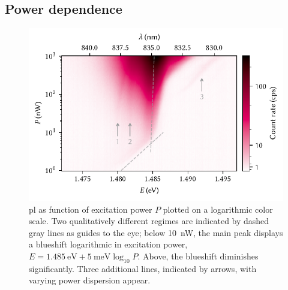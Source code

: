 \subsection{Power dependence}\label{subsec:exp:observations:pl:power}

\begin{figure}
    \centering
    \includegraphics{img/pdf/experiment/doped_M1_05_49-2_power}
    \caption[
        ,
        ,
        .
        \protect\newline
    ]{
        \Gls{pl} as function of excitation power $P$ plotted on a logarithmic color scale.
        Two qualitatively different regimes are indicated by dashed gray lines as guides to the eye; below \qty{10}{\nano\watt}, the main peak displays a blueshift logarithmic in excitation power, $E = \qty{1.485}{\electronvolt} + \qty{5}{\milli\electronvolt}\log_{10} P$.
        Above, the blueshift diminishes significantly.
        Three additional lines, indicated by arrows, with varying power dispersion appear.
    }
    \label{fig:}
\end{figure}

